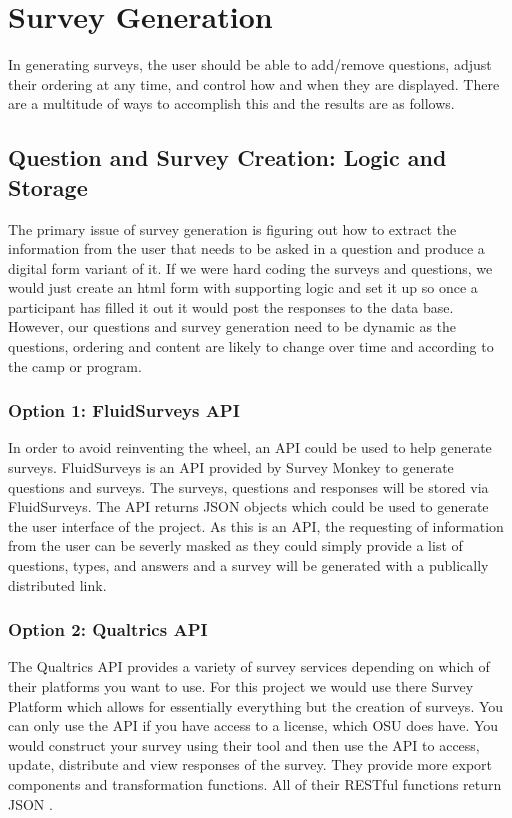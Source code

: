 \documentclass[letterpaper,10pt,serif, draftclsnofoot,onecolumn, compsoc, titlepage]{IEEEtran}
\begin{document}
\section{Survey Generation}
In generating surveys, the user should be able to add/remove questions, adjust their ordering at any time, and control how 
and when they are displayed. There are a multitude of ways to accomplish this and the results are as follows. 
\subsection{Question and Survey Creation: Logic and Storage}
The primary issue of survey generation is figuring out how to extract the information from the user that needs to be asked
in a question and produce a digital form variant of it. If we were hard coding the surveys and questions, we would just create
an html form with supporting logic and set it up so once a participant has filled it out it would post the responses to the data base. 
However, our questions and survey generation need to be dynamic as the questions, ordering and content are likely to change over
time and according to the camp or program. 
\subsubsection{Option 1: FluidSurveys API}
In order to avoid reinventing the wheel, an API could be used to help generate surveys. FluidSurveys is an API provided by Survey Monkey to generate questions and surveys. The surveys, questions and responses will be stored via FluidSurveys. The API returns JSON objects which could be used to generate the user interface of the project\cite{fluidSurveys}. As this is an API, the requesting of information 
from the user can be severly masked as they could simply provide a list of questions, types, and answers and a survey will be 
generated with a publically distributed link. 
\subsubsection{Option 2: Qualtrics API}
The Qualtrics API provides a variety of survey services depending on which of their platforms you want to use. For this project
we would use there Survey Platform which allows for essentially everything but the creation of surveys\cite{qualtricsAPI}. You can only use the 
API if you have access to a license, which OSU does have\cite{oregonStateQual}. You would construct your survey using their tool and then 
use the API to access, update, distribute and view responses of the survey. They provide more export components and 
transformation functions. All of their RESTful functions return JSON \cite{qualtricsAPI}. 
\end{document}
